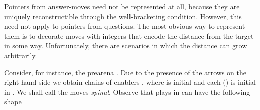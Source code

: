 \documentclass{CSML}
\theoremstyle{definition}\newtheorem{definition}[thm]{Definition}
\theoremstyle{definition}\newtheorem{example}[thm]{Example}
\theoremstyle{definition}\newtheorem{proposition}[thm]{Proposition}
\theoremstyle{definition}\newtheorem{lemma}[thm]{Lemma}
\theoremstyle{definition}\newtheorem{theorem}[thm]{Theorem}
\theoremstyle{definition}\newtheorem{corollary}[thm]{Corollary}
\theoremstyle{definition}\newtheorem{remark}[thm]{Remark}
\newcommand\nt[1]{#1}
\newcommand\cutout[1]{}
\begin{document}
Pointers from answer-moves need not be represented at all, because they are uniquely reconstructible through the well-bracketing condition.
However, this need not apply to pointers from questions. The most obvious way to represent them is to decorate moves
with integers that encode the distance from the target in some way. Unfortunately, there are scenarios in which the distance can grow arbitrarily.

\cutout{
Next we analyse two typing scenarios that look hopeless from the point of view of encoding
pointers, since the distance from the pointer can grow arbitrarily. In the first case, thanks to
block-innocence, we will be able to overcome the difficulties. The other case
must remain a challenge for future work (or an undecidability result). On the basis of 
our discussion we shall subsequently introduce the type system of .
}
Consider, for instance,  the \nt{prearena} .
Due to the presence of the  arrows on the right-hand side we obtain chains of enablers
, where  is initial and 
each  () is initial in . We shall call the moves \emph{spinal}.
Observe that plays in  can have the following shape
\end{document}
